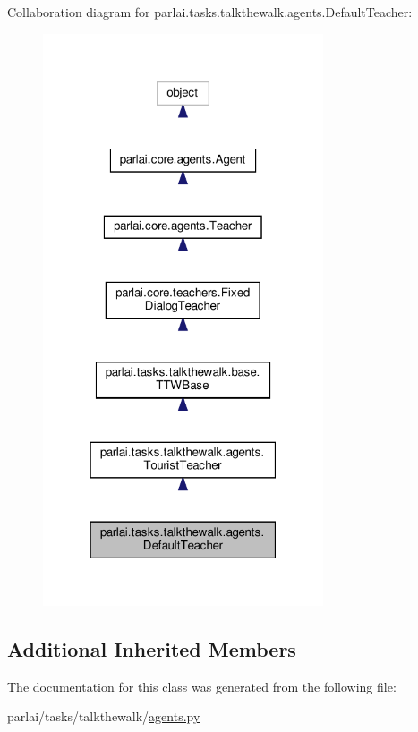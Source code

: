 Collaboration diagram for parlai.\+tasks.\+talkthewalk.\+agents.\+Default\+Teacher\+:
\nopagebreak
\begin{figure}[H]
\begin{center}
\leavevmode
\includegraphics[width=235pt]{classparlai_1_1tasks_1_1talkthewalk_1_1agents_1_1DefaultTeacher__coll__graph}
\end{center}
\end{figure}
\subsection*{Additional Inherited Members}


The documentation for this class was generated from the following file\+:\begin{DoxyCompactItemize}
\item 
parlai/tasks/talkthewalk/\hyperlink{parlai_2tasks_2talkthewalk_2agents_8py}{agents.\+py}\end{DoxyCompactItemize}
